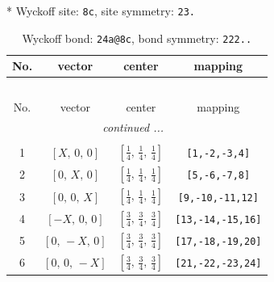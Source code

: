 \documentclass[fleqn,8pt]{jsarticle}
\begin{document}
* Wyckoff site: {\tt 8c}, site symmetry: {\tt 23.}
\renewcommand{\arraystretch}{1.2}
\begin{longtable}{cccc}
\caption{Wyckoff bond: {\tt 24a@8c}, bond symmetry: {\tt 222..}}
 \\
 \hline \hline
No. & vector & center & mapping \\ \hline \endfirsthead

\multicolumn{3}{l}{\tablename\ \thetable{}} \\
 \hline \hline
No. & vector & center & mapping \\ \hline \endhead

 \hline \hline
\multicolumn{3}{r}{\footnotesize\it continued ...} \\ \endfoot

 \hline \hline
\multicolumn{3}{r}{} \\ \endlastfoot

1 & $\left[ X,\, 0,\, 0 \right]$ & $\left[ \frac{1}{4},\, \frac{1}{4},\, \frac{1}{4} \right]$ & {\tt [1,-2,-3,4]} \\ \hline
2 & $\left[ 0,\, X,\, 0 \right]$ & $\left[ \frac{1}{4},\, \frac{1}{4},\, \frac{1}{4} \right]$ & {\tt [5,-6,-7,8]} \\ \hline
3 & $\left[ 0,\, 0,\, X \right]$ & $\left[ \frac{1}{4},\, \frac{1}{4},\, \frac{1}{4} \right]$ & {\tt [9,-10,-11,12]} \\ \hline
4 & $\left[ - X,\, 0,\, 0 \right]$ & $\left[ \frac{3}{4},\, \frac{3}{4},\, \frac{3}{4} \right]$ & {\tt [13,-14,-15,16]} \\ \hline
5 & $\left[ 0,\, - X,\, 0 \right]$ & $\left[ \frac{3}{4},\, \frac{3}{4},\, \frac{3}{4} \right]$ & {\tt [17,-18,-19,20]} \\ \hline
6 & $\left[ 0,\, 0,\, - X \right]$ & $\left[ \frac{3}{4},\, \frac{3}{4},\, \frac{3}{4} \right]$ & {\tt [21,-22,-23,24]} \\
\end{longtable}
\renewcommand{\arraystretch}{1.2}
\end{document}
